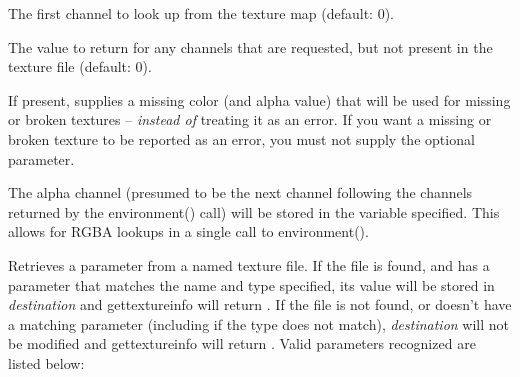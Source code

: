 \documentclass[11pt,letterpaper]{book}
\begin{document}
\vspace{12pt}
The first channel to look up from the texture map (default: 0).
\apiend
\vspace{-16pt}

\vspace{12pt}
The value to return for any channels that are requested, but 
not present in the texture file (default: 0).
\apiend
\vspace{-16pt}

\vspace{12pt}
If present, supplies a missing color (and alpha value) that will
be used for missing or broken textures -- \emph{instead of} treating
it as an error.  If you want a missing or broken texture to be reported
as an error, you must not supply the optional 
parameter.
\apiend
\vspace{-16pt}

\vspace{12pt}
The alpha channel (presumed to be the next channel following the
channels returned by the {\cf environment()} call) will be stored in the
variable specified.  This allows for RGBA lookups in a single call to
{\cf environment()}.
\apiend
\vspace{-16pt}

\apiend


\newpage
{}

Retrieves a parameter from a named texture file.  If the file is found,
and has a parameter that matches the name and type specified, its value
will be stored in \emph{destination} and {\cf gettextureinfo} will
return {}.  If the file is not found, or doesn't have a matching
parameter (including if the type does not match), \emph{destination}
will not be modified and {\cf gettextureinfo} will return {}.  Valid
parameters recognized are listed below:

\smallskip
\end{document}
